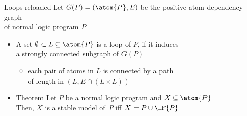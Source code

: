 \begin{frame}{Loops reloaded}
  \bigskip
  Let $G(P) = (\atom{P},E)$ be the positive atom dependency graph\\ of normal logic program $P$
  \par
  \smallskip
  \begin{itemize}
  \item<2-> A set $\emptyset\subset L \subseteq \atom{P}$ is a \alert{loop} of $P$,
    if it induces\\a{} strongly connected subgraph of $G(P)$
    \begin{itemize}\normalsize
    \item[\itarrow] each pair of atoms in $L$ is connected by a path\\
      of length in $(L,E\cap(L \times L))$
    \end{itemize}
    \medskip
  \item<5->[] \par
    \begin{minipage}[t]{0.8\linewidth}
      \begin{block}{Theorem}
        \smallskip
        Let $P$ be a normal logic program and $X\subseteq\atom{P}$
        \\
        Then, $X$ is a stable model of~$P$ iff $X\models P\cup\LF{P}$
      \end{block}
    \end{minipage}
  \end{itemize}
\end{frame}
%
